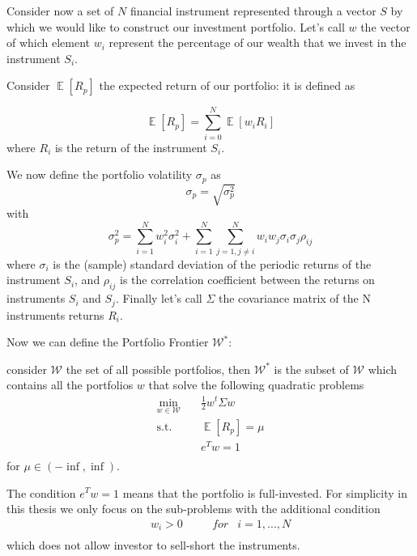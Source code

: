 Consider now a set of $N$ financial instrument represented through a vector $S$ by which we would like to construct our investment portfolio. Let's call $w$ the vector of which element $w_i$ represent the percentage of our wealth that we invest in the instrument $S_i$.


\noindent
Consider $\mathop{\mathbb{E}}\left[ R_p  \right]$ the expected return of our portfolio: it is defined as

\begin{equation}
    \mathop{\mathbb{E}}\left[ R_p  \right] = \sum_{i=0}^{N}\mathop{\mathbb{E}}\left[ w_i R_i  \right]
\end{equation}
where $R_i$ is the return of the instrument $S_i$.

\noindent
We now define the portfolio volatility $\sigma_p$ as
\begin{equation}
    \sigma_p = \sqrt{\sigma_p^2}
\end{equation}
with
\begin{equation}
    \sigma_p^2 = \sum_{i=1}^N w_i^2 \sigma_i^2 + \sum_{i=1}^N \sum_{j=1, j\neq i}^N w_i w_j \sigma_i \sigma_j \rho_{ij}
\end{equation}
where $\sigma_i$  is the (sample) standard deviation of the periodic returns of the instrument $S_i$, and $\rho_{ij}$ is the correlation coefficient between the returns on instruments $S_i$ and $S_j$.
Finally let's call $\Sigma$ the covariance matrix of the N instruments returns $R_i$.

\noindent
Now we can define the Portfolio Frontier $\mathcal{W}^*$:

consider $\mathcal{W}$ the set of all possible portfolios, then $\mathcal{W}^*$ is the subset of $\mathcal{W}$ which contains all the portfolios $w$ that solve the following quadratic problems
\begin{equation}
    \begin{aligned}
    \min_{w \in \mathcal{W}} \quad & \frac{1}{2}w^t \Sigma w\\
    \textrm{s.t.} \quad & \mathop{\mathbb{E}}\left[ R_p  \right] = \mu\\
      & e^T w = 1    \\
    \end{aligned}
\end{equation}
for $\mu \in \left( -\inf, \inf \right)$.

The condition $e^T w = 1$ means that the portfolio is full-invested. For simplicity in this thesis we only focus on the sub-problems with the additional condition
\begin{equation}
    \begin{aligned}
    \quad & w_i > 0 & \quad & for & i = 1,...,N   \\
    \end{aligned}
\end{equation}
which does not allow investor to sell-short the instruments.

